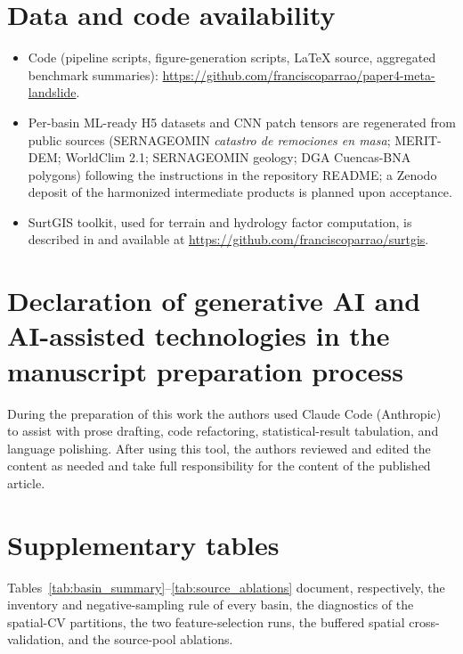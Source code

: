 \documentclass[preprint,12pt,3p,authoryear]{elsarticle}
\newcommand{\revtext}[1]{{\color{blue!70!black}#1}}
\begin{document}
\section*{Data and code availability}
\begin{itemize}
    \item Code (pipeline scripts, figure-generation scripts, LaTeX source, aggregated benchmark summaries): \url{https://github.com/franciscoparrao/paper4-meta-landslide}.
    \item Per-basin ML-ready H5 datasets and CNN patch tensors are regenerated from public sources (SERNAGEOMIN \emph{catastro de remociones en masa}; MERIT-DEM; WorldClim 2.1; SERNAGEOMIN geology; DGA Cuencas-BNA polygons) following the instructions in the repository README; a Zenodo deposit of the harmonized intermediate products is planned upon acceptance.
    \item SurtGIS toolkit, used for terrain and hydrology factor computation, is described in \citet{parra2026surtgis} and available at \url{https://github.com/franciscoparrao/surtgis}.
\end{itemize}

\section*{Declaration of generative AI and AI-assisted technologies in the manuscript preparation process}
During the preparation of this work the authors used Claude Code (Anthropic) to assist with prose drafting, code refactoring, statistical-result tabulation, and language polishing. After using this tool, the authors reviewed and edited the content as needed and take full responsibility for the content of the published article.




\appendix

\section{Supplementary tables}
\label{app:tables}

\revtext{Tables~\ref{tab:basin_summary}--\ref{tab:source_ablations} document, respectively, the inventory and negative-sampling rule of every basin, the diagnostics of the spatial-CV partitions, the two feature-selection runs, the buffered spatial cross-validation, and the source-pool ablations.}
\end{document}
